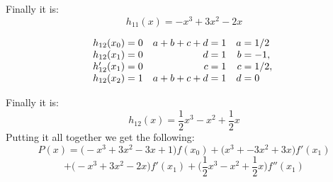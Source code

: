 \documentclass{article}
\begin{document}
Finally it is:
\[
    h_{11}(x) = -x^3 + 3x^2 - 2x
\]

\[
\begin{array}{r@{}l@{\quad}r@{}l@{\quad}r@{}l}
    h_{12}(x_0) &{}= 0 & a + b + c + d &{}= 1 & a &{}= 1/2\\
    h_{12}(x_1) &{}= 0 & d &{}= 1 & b &{}= -1,\  \\
    h'_{12}(x_1) &{}= 0 & c &{}= 1 & c &{}= 1/2,\ \\
    h_{12}(x_2) &{}= 1 & a + b + c + d &{}= 1 & d &{}= 0 \\
\end{array}
\]

Finally it is:
\[
    h_{12}(x) = \frac{1}{2}x^3 - x^2 + \frac{1}{2}x
\]
Putting it all together we get the following:
\[
    P(x) = \big( -x^3 + 3x^2 - 3x + 1 \big)f(x_0) + \big(x^3 + -3x^2 + 3x\big)f'(x_1)
\]
\[
    + \big(-x^3 + 3x^2 - 2x\big)f'(x_1) + \big(\frac{1}{2}x^3 - x^2 + \frac{1}{2}x\big)f''(x_1)
\]
\end{document}
